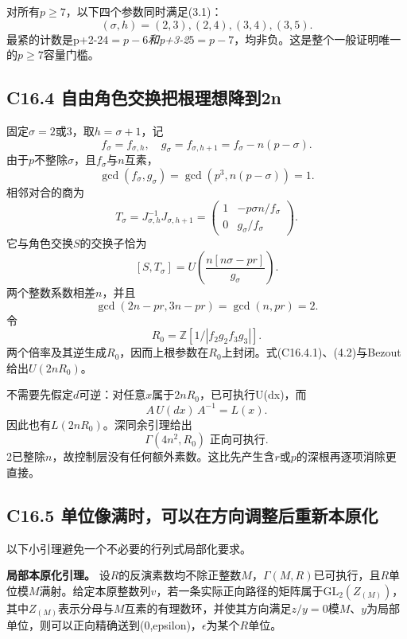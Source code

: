\documentclass[11pt,a4paper]{article}
\theoremstyle{definition}
\numberwithin{equation}{section}
\begin{document}
{对所有\ensuremath{p\ge 7}，以下四个参数同时满足(3.1)：} \[
(\sigma,h)=(2,3),(2,4),(3,4),(3,5).
\tag{C16.3.3}
\] {最紧的计数是p+2-2}\emph{{\ensuremath{4=p-6}和p+3-2}}{\ensuremath{5=p-7}，均非负。这是整个一般证明唯一的\ensuremath{p\ge 7}容量门槛。}

\subsection*{\texorpdfstring{{C16.4} {自由角色交换把根理想降到2n}}{C16.4 自由角色交换把根理想降到2n}}\label{C16-h116}

{固定\ensuremath{\sigma =2}或3，取\ensuremath{h=\sigma +1}，记} \[
f_\sigma=f_{\sigma,h},\quad
g_\sigma=f_{\sigma,h+1}=f_\sigma-n(p-\sigma).
\] {由于\ensuremath{p}不整除\ensuremath{\sigma }，且\ensuremath{f_\sigma }与\ensuremath{n}互素，} \[
\gcd(f_\sigma,g_\sigma)
=\gcd(p^3,n(p-\sigma))=1.
\] {相邻对合的商为} \[
T_\sigma=J_{\sigma,h}^{-1}J_{\sigma,h+1}
=\begin{pmatrix}1&-p\sigma n/f_\sigma\\0&g_\sigma/f_\sigma\end{pmatrix}.
\] {它与角色交换\ensuremath{S}的交换子恰为} \[
\boxed{[S,T_\sigma]=
U\left(\frac{n[n\sigma-pr]}{g_\sigma}\right).}
\tag{C16.4.1}
\] {两个整数系数相差\ensuremath{n}，并且} \[
\gcd(2n-pr,3n-pr)=\gcd(n,pr)=2.
\tag{C16.4.2}
\] {令} \[
R_0=\mathbb Z[1/|f_2g_2f_3g_3|].
\] {两个倍率及其逆生成\ensuremath{R_{0}}，因而上根参数在\ensuremath{R_{0}}上封闭。式(C16.4.1)、(4.2)与Bezout给出\ensuremath{U(2nR_{0})}。}

{不需要先假定\ensuremath{d}可逆：对任意\ensuremath{x}属于\ensuremath{2nR_{0}}，已可执行U(dx)，而} \[
A\,U(dx)\,A^{-1}=L(x).
\] {因此也有\ensuremath{L(2nR_{0})}。深同余引理给出} \[
\boxed{\Gamma(4n^2,R_0)\text{ 正向可执行}.}
\tag{C16.4.3}
\] {2已整除\ensuremath{n}，故控制层没有任何额外素数。这比先产生含\ensuremath{r}或\ensuremath{p}的深根再逐项消除更直接。}

\subsection*{\texorpdfstring{{C16.5} {单位像满时，可以在方向调整后重新本原化}}{C16.5 单位像满时，可以在方向调整后重新本原化}}\label{C16-h117}

{以下小引理避免一个不必要的行列式局部化要求。}

\textbf{{局部本原化引理。}} {设\ensuremath{R}的反演素数均不除正整数\ensuremath{M}，\ensuremath{\Gamma (M,R)}已可执行，且\ensuremath{R}单位模\ensuremath{M}满射。给定本原整数列\ensuremath{v}，若一条实际正向路径的矩阵属于\ensuremath{\mathrm{GL}_{2}(Z_(M))}，其中\ensuremath{Z_(M)}表示分母与\ensuremath{M}互素的有理数环，并使其方向满足\ensuremath{z/y=0}模\ensuremath{M}、\ensuremath{y}为局部单位，则可以正向精确送到(0,epsilon)，\ensuremath{\epsilon }为某个\ensuremath{R}单位。}
\end{document}
